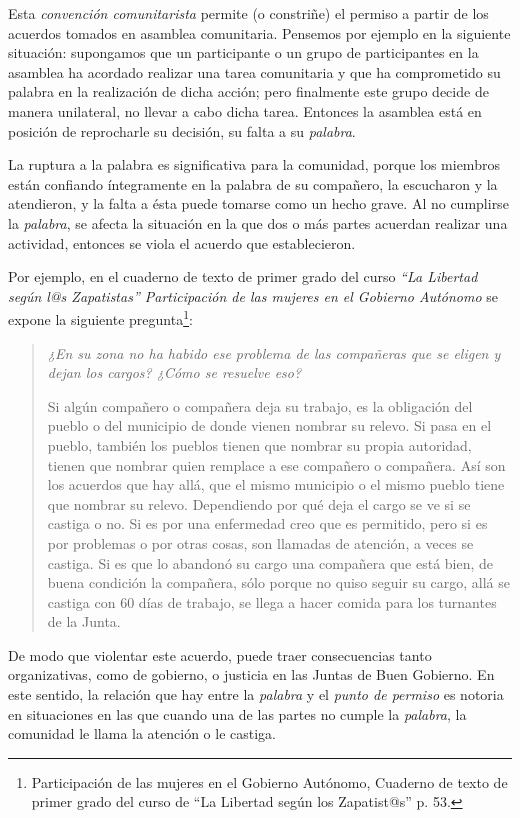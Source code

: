 \documentclass[oneside]{book}
\begin{document}
Esta \textit{convención comunitarista} permite (o constriñe) el permiso a partir de los acuerdos tomados en asamblea comunitaria. Pensemos por ejemplo en la siguiente situación: supongamos que un participante o un grupo de participantes en la asamblea ha acordado realizar una tarea comunitaria y que ha comprometido su palabra en la realización de dicha acción; pero finalmente este grupo decide de manera unilateral, no llevar a cabo dicha tarea. Entonces la asamblea está en posición de reprocharle su decisión, su falta a su \textit{palabra}.

La ruptura a la palabra es significativa para la comunidad, porque los miembros están confiando íntegramente en la palabra de su compañero, la escucharon y la atendieron, y la falta a ésta puede tomarse como un hecho grave. Al no cumplirse la \textit{palabra}, se afecta la situación en la que dos o más partes acuerdan realizar una actividad, entonces se viola el acuerdo que establecieron.

Por ejemplo, en el cuaderno de texto de primer grado del curso \textit{“La Libertad según l@s Zapatistas” Participación de las mujeres en el Gobierno Autónomo} se expone la siguiente pregunta\footnote{Participación de las mujeres en el Gobierno Autónomo, Cuaderno de texto de primer grado del curso de “La Libertad según los Zapatist@s” p. 53.}:
\begin{quote}

	\textit{¿En su zona no ha habido ese problema de las compañeras que se eligen y dejan los cargos? ¿Cómo se resuelve eso?}

Si algún compañero o compañera deja su trabajo, es la obligación del pueblo o del municipio de donde vienen nombrar su relevo. Si pasa en el pueblo, también los pueblos tienen que nombrar su propia autoridad, tienen que nombrar quien remplace a ese compañero o compañera. Así son los acuerdos que hay allá, que el mismo municipio o el mismo pueblo tiene que nombrar su relevo. Dependiendo por qué deja el cargo se ve si se castiga o no. Si es por una enfermedad creo que es permitido, pero si es por problemas o por otras cosas, son llamadas de atención, a veces se castiga. Si es que lo abandonó su cargo una compañera que está bien, de buena condición la compañera, sólo porque no quiso seguir su cargo, allá se castiga con 60 días de trabajo, se llega a hacer comida para los turnantes de la Junta.
\end{quote}
De modo que violentar este acuerdo, puede traer consecuencias tanto organizativas, como de gobierno, o justicia en las Juntas de Buen Gobierno. En este sentido, la relación que hay entre la \textit{palabra} y el \textit{punto de permiso} es notoria en situaciones en las que cuando una de las partes no cumple la \textit{palabra}, la comunidad le llama la atención o le castiga.
\end{document}
